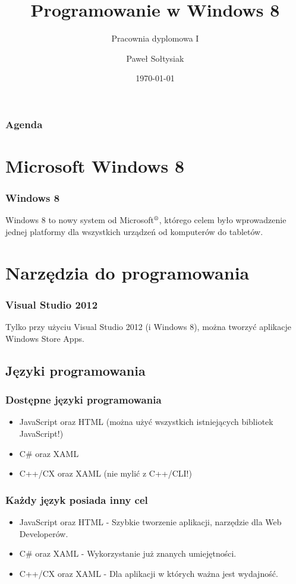 \documentclass{beamer}
\title{Programowanie w Windows 8}
\subtitle{Pracownia dyplomowa I}
\author{Paweł Sołtysiak}
\institute{Wydział Informatyki\\ Zachodniopomorski Uniwersytet Technologiczny w Szczecinie}
\date{\today}
\begin{document}
\begin{frame}
\titlepage
\end{frame} 


\begin{frame}
\frametitle{Agenda} 
\tableofcontents
\end{frame} 

\section{Microsoft Windows 8}
\begin{frame}
\frametitle{Windows 8} 
Windows 8 to nowy system od Microsoft$\textsuperscript{\textregistered}$, którego celem było wprowadzenie jednej platformy dla wszystkich urządzeń od komputerów do tabletów.
\end{frame}

\section{Narzędzia do programowania}
\begin{frame}
\frametitle{Visual Studio 2012} 
Tylko przy użyciu Visual Studio 2012 (i Windows 8), można tworzyć aplikacje Windows Store Apps.
\end{frame}

\subsection{Języki programowania}
\begin{frame}
\frametitle{Dostępne języki programowania} 
\begin{itemize}
\item JavaScript oraz HTML (można użyć wszystkich istniejących bibliotek JavaScript!)
\item C\# oraz XAML
\item C++/CX oraz XAML (nie mylić z C++/CLI!)
\end{itemize} 
\end{frame}

\begin{frame}
\frametitle{Każdy język posiada inny cel} 
\begin{itemize}
\item JavaScript oraz HTML - Szybkie tworzenie aplikacji, narzędzie dla Web Developerów.
\item C\# oraz XAML - Wykorzystanie już znanych umiejętności.
\item C++/CX oraz XAML - Dla aplikacji w których ważna jest wydajność.
\end{itemize} 
\end{frame}
\end{document}
